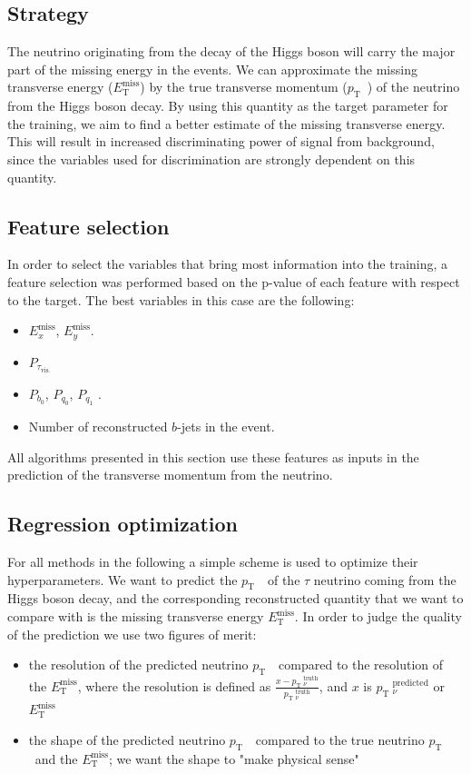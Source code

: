 \documentclass[twocolumn]{scrartcl}
\newcommand{\etmiss}{$E_\mathrm{T}^\text{miss}$}
\newcommand{\exmiss}{$E_x^\text{miss}$}
\newcommand{\eymiss}{$E_y^\text{miss}$}
\newcommand{\pt}{\ensuremath{p_\text{T}}~}
\begin{document}
\subsection{Strategy}
The neutrino originating from the decay of the Higgs boson will carry the major part of the missing energy in the events. We can approximate the missing transverse energy (\etmiss) by the true transverse momentum (\pt) of the neutrino from the Higgs boson decay. By using this quantity as the target parameter for the training, we aim to find a better estimate of the missing transverse energy. This will result in increased discriminating power of signal from background, since the variables used for discrimination are strongly dependent on this quantity.

\subsection{Feature selection}
In order to select the variables that bring most information into the training, a feature selection was performed based on the p-value of each feature with respect to the target. The best variables in this case are the following:

\begin{itemize}
    \item \exmiss, \eymiss.
    \item $P_{\tau_\mathrm{vis.}}$ 
     \item $P_{b_0}$, $P_{q_0}$, $P_{q_1}$ .
     \item Number of reconstructed $b$-jets in the event.
\end{itemize}

All algorithms presented in this section use these features as inputs in the prediction of the transverse momentum from the neutrino.

\subsection{Regression optimization}
\label{sec:optimization}
For all methods in the following a simple scheme is used to optimize their hyperparameters. We want to predict the \pt\ of the $τ$ neutrino coming from the Higgs boson decay, and the corresponding reconstructed quantity that we want to compare with is the missing transverse energy \etmiss. In order to judge the quality of the prediction we use two figures of merit:
\begin{itemize}
  \item the resolution of the predicted neutrino \pt\ compared to the resolution of the \etmiss, where the resolution is defined as $\frac{x-\pt_ν^{\text{truth}}}{\pt_ν^{\text{truth}}}$, and $x$ is $\pt_ν^{\text{predicted}}$ or \etmiss
  \item the shape of the predicted neutrino \pt\ compared to the true neutrino \pt and the \etmiss; we want the shape to "make physical sense"
\end{itemize}
\end{document}
